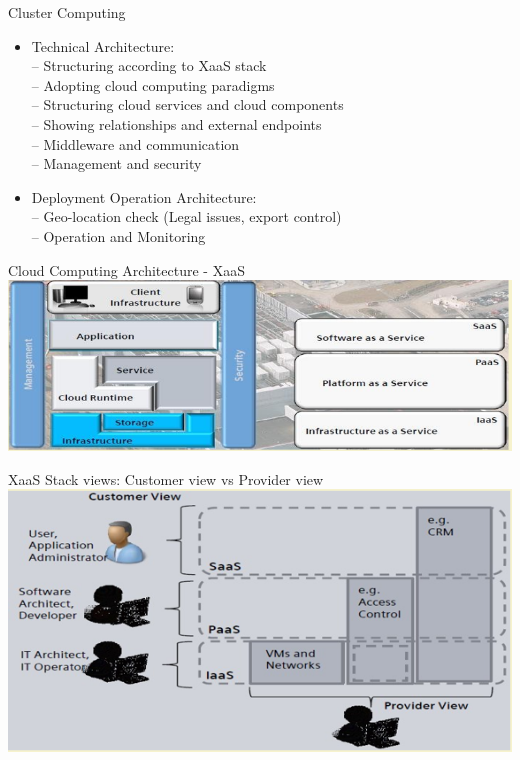 \documentclass{SKP-beamer}
\begin{document}
\begin{frame}{ Cluster Computing}
	\begin{itemize}
		\item Technical Architecture: \\
		– Structuring according to XaaS stack \\
		– Adopting cloud computing paradigms \\
		– Structuring cloud services and cloud components \\
		– Showing relationships and external endpoints \\
		– Middleware and communication \\
		– Management and security
		
	    \item Deployment Operation Architecture: \\
	    -- Geo-location check (Legal issues, export control) \\
	    -- Operation and Monitoring
		
	\end{itemize}
\end{frame}


\begin{frame}{Cloud Computing Architecture - XaaS}
	\includegraphics[scale=0.6]{g.png}
\end{frame}

\begin{frame}{XaaS Stack views: Customer view vs Provider view}
	\includegraphics[scale=0.8]{h.png}
\end{frame}
\end{document}
